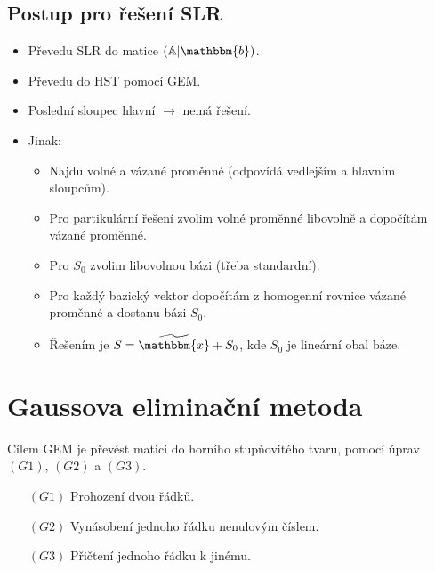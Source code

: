 \documentclass{szzclass}
\begin{document}
\subsection{Postup pro řešení SLR}
\begin{itemize}
\item Převedu SLR do matice $(\mathbb{A}|\mathbbm{b})$.
\item Převedu do HST pomocí GEM.
\item Poslední sloupec hlavní $\rightarrow$ nemá řešení.
\item Jinak:
  \begin{itemize}
  \item Najdu volné a vázané proměnné (odpovídá vedlejším a hlavním sloupcům).
  \item Pro partikulární řešení zvolim volné proměnné libovolně a dopočítám vázané proměnné.
  \item Pro $S_0$ zvolim libovolnou bázi (třeba standardní).
  \item Pro každý bazický vektor dopočítám z homogenní rovnice vázané proměnné a dostanu bázi $S_0$.
  \item Řešením je $S=\widetilde{\mathbbm{x}}+S_0$, kde $S_0$ je lineární obal báze.
  \end{itemize}
\end{itemize}

\section{Gaussova eliminační metoda}
Cílem GEM je převést matici do horního stupňovitého tvaru, pomocí úprav $(G1)$, $(G2)$ a $(G3)$.

\begin{itemize}
\item[$(G1)$] Prohození dvou řádků.
\item[$(G2)$] Vynásobení jednoho řádku nenulovým číslem.
\item[$(G3)$] Přičtení jednoho řádku k jinému.
\end{itemize}
\end{document}
